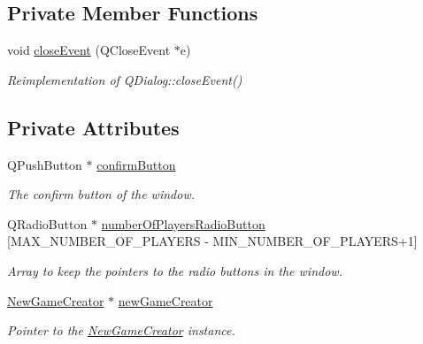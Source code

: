 \subsection*{Private Member Functions}
\begin{DoxyCompactItemize}
\item 
void \hyperlink{classNumberOfPlayersWindow_afefa90be1b7ddf10ac84744a7b79816d}{close\+Event} (Q\+Close\+Event $\ast$e)
\begin{DoxyCompactList}\small\item\em Reimplementation of Q\+Dialog\+::close\+Event() \end{DoxyCompactList}\end{DoxyCompactItemize}
\subsection*{Private Attributes}
\begin{DoxyCompactItemize}
\item 
\mbox{\label{classNumberOfPlayersWindow_a56a9fa50a2568bd693ec4ac0b1c4c2a4}} 
Q\+Push\+Button $\ast$ \hyperlink{classNumberOfPlayersWindow_a56a9fa50a2568bd693ec4ac0b1c4c2a4}{confirm\+Button}
\begin{DoxyCompactList}\small\item\em The confirm button of the window. \end{DoxyCompactList}\item 
\mbox{\label{classNumberOfPlayersWindow_a2faa8f67709fa2da57936c57236be6c7}} 
Q\+Radio\+Button $\ast$ \hyperlink{classNumberOfPlayersWindow_a2faa8f67709fa2da57936c57236be6c7}{number\+Of\+Players\+Radio\+Button} \mbox{[}M\+A\+X\+\_\+\+N\+U\+M\+B\+E\+R\+\_\+\+O\+F\+\_\+\+P\+L\+A\+Y\+E\+RS -\/ M\+I\+N\+\_\+\+N\+U\+M\+B\+E\+R\+\_\+\+O\+F\+\_\+\+P\+L\+A\+Y\+E\+RS+1\mbox{]}
\begin{DoxyCompactList}\small\item\em Array to keep the pointers to the radio buttons in the window. \end{DoxyCompactList}\item 
\mbox{\label{classNumberOfPlayersWindow_a7a4c90e2553e4f401fde3ec81e7e3f56}} 
\hyperlink{classNewGameCreator}{New\+Game\+Creator} $\ast$ \hyperlink{classNumberOfPlayersWindow_a7a4c90e2553e4f401fde3ec81e7e3f56}{new\+Game\+Creator}
\begin{DoxyCompactList}\small\item\em Pointer to the \hyperlink{classNewGameCreator}{New\+Game\+Creator} instance. \end{DoxyCompactList}\end{DoxyCompactItemize}


